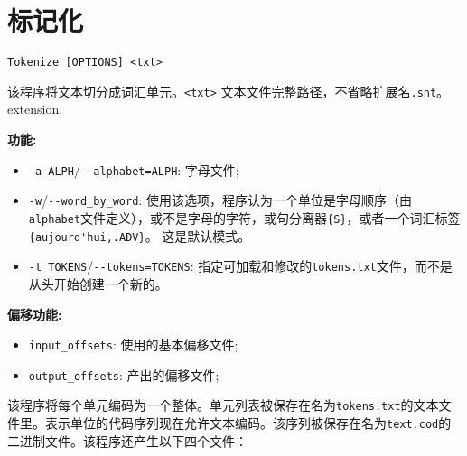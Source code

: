 \section{标记化}
\label{section-Tokenize}
\verb+Tokenize [OPTIONS] <txt>+

\bigskip
\noindent 该程序将文本切分成词汇单元。\verb+<txt>+ 文本文件完整路径，不省略扩展名\verb+.snt+。
extension.

\bigskip
\noindent \textbf{功能:}
\begin{itemize}
  \item \verb+-a ALPH+/\verb+--alphabet=ALPH+: 字母文件;


 \item \verb+-w+/\verb+--word_by_word+: 使用该选项，程序认为一个单位是字母顺序（由\verb+alphabet+文件定义），或不是字母的字符，或句分离器\verb+{S}+，或者一个词汇标签
 	 \verb+{aujourd'hui,.ADV}+。 
    这是默认模式。

\item \verb+-t TOKENS+/\verb+--tokens=TOKENS+: 指定可加载和修改的\verb+tokens.txt+文件，而不是从头开始创建一个新的。
\end{itemize}
\bigskip
\noindent \textbf{偏移功能:}
\begin{itemize}
\item \verb+input_offsets+: 使用的基本偏移文件;
\item \verb+output_offsets+: 产出的偏移文件;
\end{itemize}


\bigskip
\noindent 该程序将每个单元编码为一个整体。单元列表被保存在名为\verb+tokens.txt+的文本文件里。表示单位的代码序列现在允许文本编码。该序列被保存在名为\verb+text.cod+的二进制文件。该程序还产生以下四个文件：


